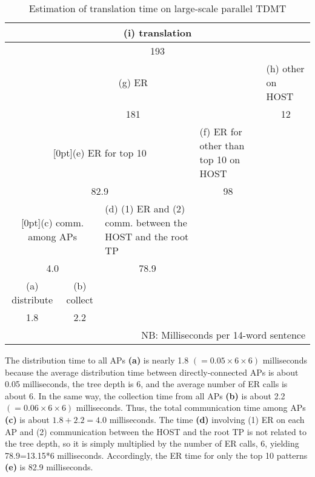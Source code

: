 \begin{table}[t]
  \begin{center}
    \caption{Estimation of translation time on large-scale parallel TDMT}
    \label{tbl-estimation-result}
    \tabcolsep=1mm
    \begin{tabular}{|c|c|p{37mm}|p{32mm}|p{27mm}|} \hline
      \multicolumn{5}{|c|}{(i) translation}\\ \hline
      \multicolumn{5}{|c|}{193}\\ \hline
      \multicolumn{4}{|c|}{(g) ER} & (h) other on HOST\\ \hline
      \multicolumn{4}{|c|}{181} & \multicolumn{1}{|c|}{12}\\ \cline{1-4}
      \multicolumn{3}{|c|}{\raisebox{-1.3ex}[0pt]{(e) ER for top 10}} & (f) ER for other \vspace{-1ex} than top 10 on HOST & \\ \cline{1-4}
      \multicolumn{3}{|c|}{82.9} & \multicolumn{1}{|c|}{98} & \\ \cline{1-3}
      \multicolumn{2}{|c|}{\raisebox{-2.5ex}[0pt]{(c) comm. among APs}} & (d) (1) ER and \vspace{-1ex} (2) comm.\mbox{} between \vspace{-1ex} the HOST and the root TP & & \\ \cline{1-3}
      \multicolumn{2}{|c|}{4.0} & \multicolumn{1}{|c|}{78.9} & & \\ \cline{1-2}
      (a) distribute & (b) collect & & & \\ \cline{1-2}
       1.8 & 2.2 & & & \\ \hline
      \multicolumn{5}{r}{NB: Milliseconds  per 14-word sentence}
    \end{tabular}
  \end{center}
\end{table}


 The distribution time to all APs  {\bf (a)} is 
nearly
1.8 $(=0.05\times 6\times 6)$ milliseconds because
the average distribution time between directly-connected APs is about 0.05
milliseconds, the tree depth is 6, and the
average number of ER calls is about 6.
In the same way, the collection time from all APs {\bf (b)} is about
2.2 $(=0.06\times 6 \times 6)$ milliseconds.
Thus, the total communication time among APs {\bf (c)} is about $1.8+2.2=4.0$
milliseconds. 
The time {\bf (d)} 
involving (1) ER on each AP and 
(2) communication between the HOST and the root TP
is not related to the 
tree depth, so it is simply multiplied by the number of ER calls, 6, 
yielding 78.9=13.15*6 milliseconds.
Accordingly, the ER time for only the top 10 patterns {\bf (e)} is 82.9 
milliseconds.

